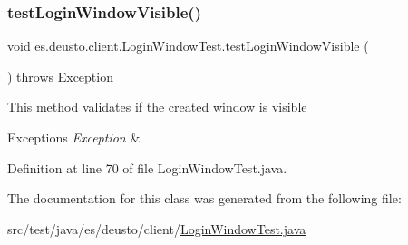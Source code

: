 \mbox{\label{classes_1_1deusto_1_1client_1_1_login_window_test_af3a9c3aab7052bc279bd98b5f34dc574}} 
\subsubsection{\texorpdfstring{test\+Login\+Window\+Visible()}{testLoginWindowVisible()}}
{\footnotesize\ttfamily void es.\+deusto.\+client.\+Login\+Window\+Test.\+test\+Login\+Window\+Visible (\begin{DoxyParamCaption}{ }\end{DoxyParamCaption}) throws Exception}

This method validates if the created window is visible


\begin{DoxyExceptions}{Exceptions}
{\em Exception} & \\
\hline
\end{DoxyExceptions}


Definition at line 70 of file Login\+Window\+Test.\+java.



The documentation for this class was generated from the following file\+:\begin{DoxyCompactItemize}
\item 
src/test/java/es/deusto/client/\hyperlink{_login_window_test_8java}{Login\+Window\+Test.\+java}\end{DoxyCompactItemize}
